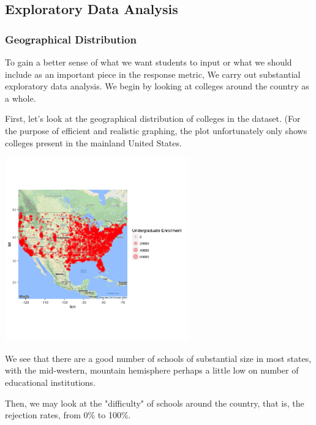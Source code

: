 \documentclass{article}\usepackage[]{graphicx}\usepackage[]{color}
\newenvironment{knitrout}{}{} %
\begin{document}
\subsection{Exploratory Data Analysis}

\subsubsection{Geographical Distribution}
To gain a better sense of what we want students to input or what we should include as an important piece in the response metric, We carry out substantial exploratory data analysis. We begin by looking at colleges around the country as a whole.\newline

First, let's look at the geographical distribution of colleges in the dataset. (For the purpose of efficient  and realistic graphing, the plot unfortunately only shows colleges present in the mainland United States.

\begin{knitrout}
\color{fgcolor}

{\centering \includegraphics[width=300px]{../images/ggmap-schoolDistribution} 

}



\end{knitrout}

We see that there are a good number of schools of substantial size in most states, with the mid-western, mountain hemisphere perhaps a little low on number of educational institutions.\newline

Then, we may look at the "difficulty" of schools around the country, that is, the rejection rates, from 0\% to 100\%. 
\end{document}
